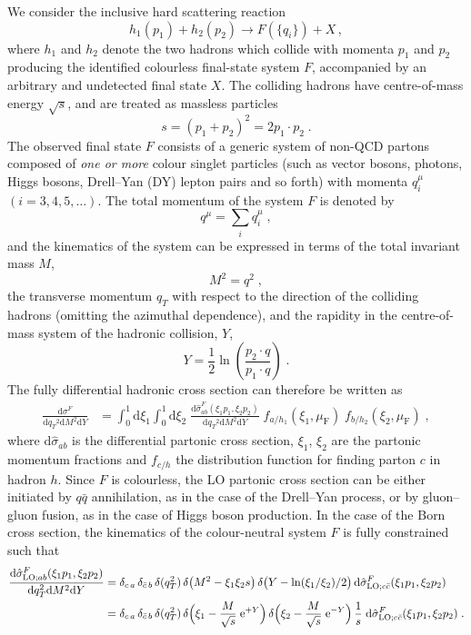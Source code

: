 \documentclass[12pt]{article}
\DeclareRobustCommand{\nn}{\nonumber}
\DeclareRobustCommand{\muf}{\ensuremath{\mu_{\mathrm{F}}}\xspace}
\DeclareRobustCommand{\qt}{\ensuremath{q_T}\xspace}
\DeclareRobustCommand{\rd}{\ensuremath{\mathrm{d}}}
\DeclareRobustCommand{\re}{\ensuremath{\mathrm{e}}}
\DeclareRobustCommand{\LO}{\text{LO}\xspace}
\begin{document}
We consider the inclusive hard scattering reaction 
\begin{equation}
  h_1(p_1)+h_2(p_2)\to F(\{q_i\})+X\, ,
  \label{class}
\end{equation}
where $h_1$ and $h_2$ denote the two hadrons which collide with momenta $p_1$ and $p_2$ producing the identified colourless final-state system $F$, accompanied by an arbitrary and undetected final state $X$. The colliding hadrons have centre-of-mass energy $\sqrt s$, and are treated as massless particles 
$$s= (p_1+p_2)^2 = 2p_1\cdot p_2 \;.$$ 
The observed final state $F$ consists of a generic system of non-QCD partons composed of \emph{one or more} colour singlet particles (such as vector bosons, photons, Higgs bosons, Drell--Yan (DY) lepton pairs and so forth) with momenta $q_i^{\mu}$ $(i=3,4,5,\dots)$. The total momentum of the system $F$ is denoted by 
$$q^{\mu}=\sum_i q_i^\mu \;,$$
and the kinematics of the system can be expressed in terms of the total invariant mass $M$, 
$$M^2=q^2 \;,$$ 
the transverse momentum $\qt$ with respect to the direction of the colliding hadrons (omitting the azimuthal dependence), and the rapidity in the centre-of-mass system of the hadronic collision, $Y$, 
$$Y = \frac{1}{2} \ln \left(\frac{p_2\cdot q}{p_1\cdot q}\right) \;.$$ 
The fully differential hadronic cross section can therefore be written as 
\begin{align}
  \frac{\rd\sigma^{F}}{\rd\qt^2\rd M^2\rd Y}
  &=
  \int_0^1\rd \xi_1 \int_0^1\rd \xi_2 \; 
  \frac{\rd\hat{\sigma}^{F}_{ab}(\xi_1 p_1, \xi_2 p_2)}{\rd\qt^2\rd M^2\rd Y} \;
  f_{a/h_1}(\xi_1,\muf) \; f_{b/h_2}(\xi_2,\muf) \;,
  \label{eq:hadXS_diff}
\end{align}
where $\rd\hat{\sigma}_{ab}$ is the differential partonic cross section, $\xi_1$, $\xi_2$ are the partonic momentum fractions and $f_{c/h}$ the distribution function for finding parton $c$ in hadron $h$.
Since $F$ is colourless, the LO partonic cross section can be either initiated by 
$q\bar{q}$ annihilation, as in the case of the Drell--Yan process, or by gluon--gluon fusion, as in the case of Higgs boson production.
In the case of the Born cross section, the kinematics of the colour-neutral system $F$ is fully constrained such that
\begin{align}
  \frac{\rd\hat{\sigma}^{F}_{\LO;ab}(\xi_1 p_1, \xi_2 p_2)}{\rd\qt^2\rd M^2\rd Y}
  &=
  \delta_{c\,a} \, \delta_{\bar{c}\,b} \, 
  \delta(\qt^2) \,
  \delta\bigl(M^2-\xi_1 \xi_2 s\bigr) \,
  \delta\bigl(Y-\ln(\xi_1/\xi_2)/2\bigr) \,
  \rd\hat{\sigma}^{F}_{\LO;c\bar{c}}(\xi_1 p_1, \xi_2 p_2)
  \nn\\
  &=
  \delta_{c\,a} \, \delta_{\bar{c}\,b} \, 
  \delta(\qt^2) \,
  \delta\Bigl(\xi_1-\frac{M}{\sqrt{s}}\;\re^{+Y}\Bigr) \,
  \delta\Bigl(\xi_2-\frac{M}{\sqrt{s}}\;\re^{-Y}\Bigr) \,
  \frac{1}{s} \;
  \rd\hat{\sigma}^{F}_{\LO;c\bar{c}}(\xi_1 p_1, \xi_2 p_2) \;.
  \label{eq:LOpartXS_diff}
\end{align}
\end{document}
